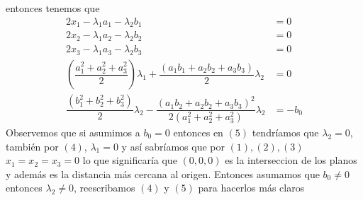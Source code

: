\documentclass[letterpaper]{article}
\renewcommand{\l}{\lambda}
\renewcommand{\*}{\cdot}
\theoremstyle{definition}
\begin{document}
entonces tenemos que 
\setcounter{equation}{0}
\begin{align}
	2x_1 - \l_1 a_1 - \l_2 b_1 &= 0\\
	2x_2 - \l_1 a_2 - \l_2 b_2 &= 0\\
	2x_3 - \l_1 a_3 - \l_2 b_3 &= 0\\
	\left( \dfrac{a_1^2 + a_2^2 + a_3^2}{2} \right)\l_1 + \dfrac{(a_1 b_1 + a_2 b_2 + a_3 b_3)}{2}\l_2 &= 0\\
	\dfrac{(b_1^2 + b_2^2 + b_3^2 )}{2} \l_2 - \dfrac{(a_1 b_2 + a_2 b_2 + a_3 b_3)^2}{2(a_1^2 + a_2^2 + a_3^2)}\l_2 &= -b_0 
\end{align}
Observemos que si asumimos a $ b_0 = 0 $ entonces en $ (5) $ tendríamos que $ \l_2 = 0 $, también por $ (4) $, $ \lambda_1 = 0 $ y así sabríamos que por $ (1),(2),(3) $ $ x_1 = x_2 = x_3 = 0 $ lo que significaría que $ (0,0,0) $ es la interseccion de los planos y además es la distancia más cercana al origen. Entonces asumamos que $ b_0 \neq 0 $ entonces $ \l_2 \neq 0 $, reescribamos $ (4) $ y $ (5) $ para hacerlos más claros
\end{document}
